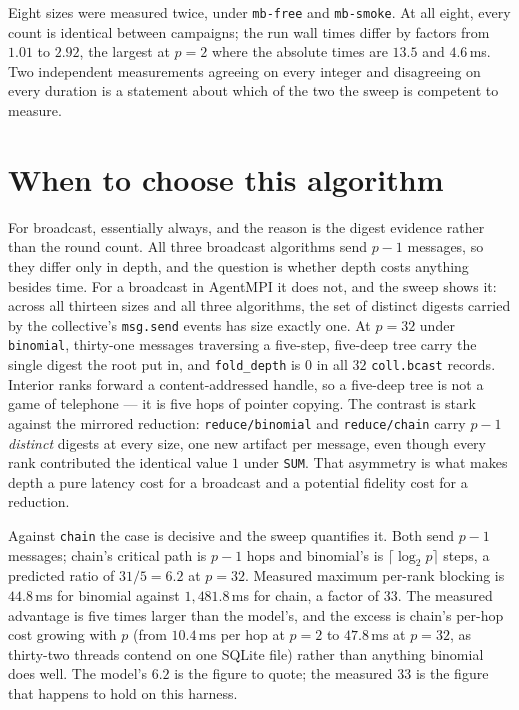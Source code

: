 \documentclass[11pt]{article}
\begin{document}
Eight sizes were measured twice, under \texttt{mb-free} and \texttt{mb-smoke}. At all eight,
every count is identical between campaigns; the run wall times differ by factors from $1.01$
to $2.92$, the largest at $p=2$ where the absolute times are $13.5$ and $4.6$\,ms. Two
independent measurements agreeing on every integer and disagreeing on every duration is a
statement about which of the two the sweep is competent to measure.

\section{When to choose this algorithm}

For broadcast, essentially always, and the reason is the digest evidence rather than the round
count. All three broadcast algorithms send $p-1$ messages, so they differ only in depth, and
the question is whether depth costs anything besides time. For a broadcast in AgentMPI it does
not, and the sweep shows it: across all thirteen sizes and all three algorithms, the set of
distinct digests carried by the collective's \texttt{msg.send} events has size exactly one. At
$p=32$ under \texttt{binomial}, thirty-one messages traversing a five-step, five-deep tree
carry the single digest the root put in, and \texttt{fold\_depth} is $0$ in all $32$
\texttt{coll.bcast} records. Interior ranks forward a content-addressed handle, so a
five-deep tree is not a game of telephone --- it is five hops of pointer copying. The
contrast is stark against the mirrored reduction: \texttt{reduce/binomial} and
\texttt{reduce/chain} carry $p-1$ \emph{distinct} digests at every size, one new artifact per
message, even though every rank contributed the identical value $1$ under \texttt{SUM}. That
asymmetry is what makes depth a pure latency cost for a broadcast and a potential fidelity
cost for a reduction.

Against \texttt{chain} the case is decisive and the sweep quantifies it. Both send $p-1$
messages; chain's critical path is $p-1$ hops and binomial's is $\lceil\log_2 p\rceil$ steps,
a predicted ratio of $31/5 = 6.2$ at $p=32$. Measured maximum per-rank blocking is $44.8$\,ms
for binomial against $1{,}481.8$\,ms for chain, a factor of $33$. The measured advantage is
five times larger than the model's, and the excess is chain's per-hop cost growing with $p$
(from $10.4$\,ms per hop at $p=2$ to $47.8$\,ms at $p=32$, as thirty-two threads contend on
one SQLite file) rather than anything binomial does well. The model's $6.2$ is the figure to
quote; the measured $33$ is the figure that happens to hold on this harness.
\end{document}
